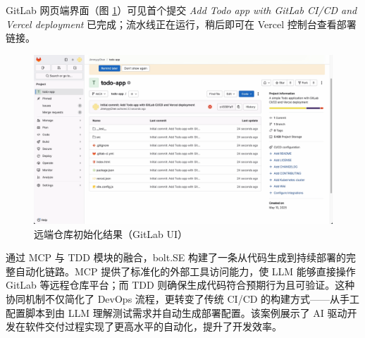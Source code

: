 GitLab 网页端界面（图 \ref{fig:gitlab_repo}）可见首个提交 \textit{Add Todo app with GitLab CI/CD and Vercel deployment} 已完成；流水线正在运行，稍后即可在 Vercel 控制台查看部署链接。

\begin{figure}
  \centering
  \includegraphics[width=\textwidth]{figures/screenshots/ci-cd/gitlab_repo.png}
  \caption{远端仓库初始化结果（GitLab UI）}
  \label{fig:gitlab_repo}
\end{figure}

通过 MCP 与 TDD 模块的融合，bolt.SE 构建了一条从代码生成到持续部署的完整自动化链路。MCP 提供了标准化的外部工具访问能力，使 LLM 能够直接操作 GitLab 等远程仓库平台；而 TDD 则确保生成代码符合预期行为且可验证。这种协同机制不仅简化了 DevOps 流程，更转变了传统 CI/CD 的构建方式——从手工配置脚本到由 LLM 理解测试需求并自动生成部署配置。该案例展示了 AI 驱动开发在软件交付过程实现了更高水平的自动化，提升了开发效率。
